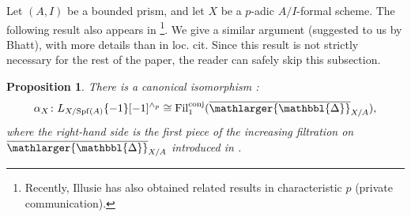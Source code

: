 \documentclass{amsart}
\newcommand{\prism}{{\mathlarger{\mathbbl{\Delta}}}}
\theoremstyle{plain}
\newtheorem{proposition}[theorem]{Proposition}
\theoremstyle{definition}
\newcommand{\green}[1]{{\color{black}#1}}
\begin{document}
Let $(A,I)$ be a bounded prism, and let $X$ be a $p$-adic $A/I$-formal scheme. The following result also appears in \cite[Proposition 4.14]{bhatt_scholze_prisms_and_prismatic_cohomology}\footnote{Recently, Illusie has also obtained related results in characteristic $p$ (private communication).}. We give a similar argument (suggested to us by Bhatt), with more details than in loc. cit. \green{Since this result is not strictly necessary for the rest of the paper, the reader can safely skip this subsection.}

\begin{proposition}
\label{sec:isom-trunc-prism-cohom-cotangent-complex}
There is a canonical isomorphism :
$$
\alpha_X \colon L_{X/\mathrm{Spf}(A)}\{-1\}[-1]^{\wedge_p}\cong \mathrm{Fil}_{1}^{\mathrm{conj}}(\overline{\prism}_{X/A}),
$$
where the right-hand side is the first piece of the increasing filtration on $\overline{\prism}_{X/A}$ introduced  in .
\end{proposition}
\end{document}
